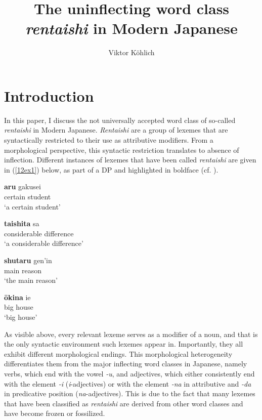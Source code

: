 \documentclass[output=paper,colorlinks,citecolor=brown]{langscibook}
\author{Viktor Köhlich\orcid{}\affiliation{Goethe University Frankfurt}}
\title{The uninflecting word class \textit{rentaishi} in Modern Japanese}
\begin{document}
\maketitle

\section{Introduction} 
In this paper, I discuss the not universally accepted word class of so-called \emph{rentaishi} in Modern Japanese. \emph{Rentaishi} are a group of lexemes that are syntactically restricted to their use as attributive modifiers. From a morphological perspective, this syntactic restriction translates to absence of inflection. Different instances of lexemes that have been called \emph{rentaishi} are given in (\ref{12ex1}) below, as part of a DP and highlighted in boldface (cf. \citealt{sekine1937, kai1980, kim2006, matsubara2009}).

\begin{exe}
	\ex \label{12ex1}
	\begin{xlist}
		\ex 
		\gll \textbf{aru} gakusei \\
		certain student \\
		\trans ‘a certain student’
		
		\ex 
		\gll \textbf{taishita} sa \\
		considerable difference \\
		\trans ‘a considerable difference’
		
		\ex 
		\gll \textbf{shutaru} gen’in \\
		main reason \\
		\trans ‘the main reason’
		
		\ex 
		\gll \textbf{ōkina} ie \\
		big house \\
		\trans ‘big house’
	\end{xlist}
\end{exe}

As visible above, every relevant lexeme serves as a modifier of a noun, and that is the only syntactic environment such lexemes appear in. Importantly, they all exhibit different morphological endings. This morphological heterogeneity differentiates them from the major inflecting word classes in Japanese, namely verbs, which end with the vowel \emph{-u}, and adjectives, which either consistently end with the element \emph{-i} (\emph{i}-adjectives) or with the element \emph{-na} in attributive and \emph{-da} in predicative position (\emph{na}-adjectives). This is due to the fact that many lexemes that have been classified as \emph{rentaishi} are derived from other word classes and have become frozen or fossilized.
\end{document}
